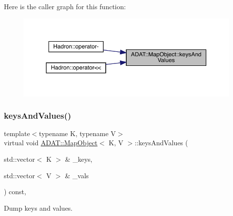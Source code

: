 Here is the caller graph for this function\+:
\nopagebreak
\begin{figure}[H]
\begin{center}
\leavevmode
\includegraphics[width=350pt]{da/d29/classADAT_1_1MapObject_ab19c1622f3edfd0755e42583e6a48844_icgraph}
\end{center}
\end{figure}
\mbox{\label{classADAT_1_1MapObject_ab19c1622f3edfd0755e42583e6a48844}} 
\subsubsection{\texorpdfstring{keysAndValues()}{keysAndValues()}\hspace{0.1cm}{\footnotesize\ttfamily [3/3]}}
{\footnotesize\ttfamily template$<$typename K, typename V$>$ \\
virtual void \mbox{\hyperlink{classADAT_1_1MapObject}{A\+D\+A\+T\+::\+Map\+Object}}$<$ K, V $>$\+::keys\+And\+Values (\begin{DoxyParamCaption}\item[{std\+::vector$<$ K $>$ \&}]{\+\_\+keys,  }\item[{std\+::vector$<$ V $>$ \&}]{\+\_\+vals }\end{DoxyParamCaption}) const\hspace{0.3cm}{\ttfamily [inline]}, {\ttfamily [virtual]}}



Dump keys and values. 

\mbox{\label{classADAT_1_1MapObject_adb014dc7d3ef80a73fd1734e818eeef4}} 
